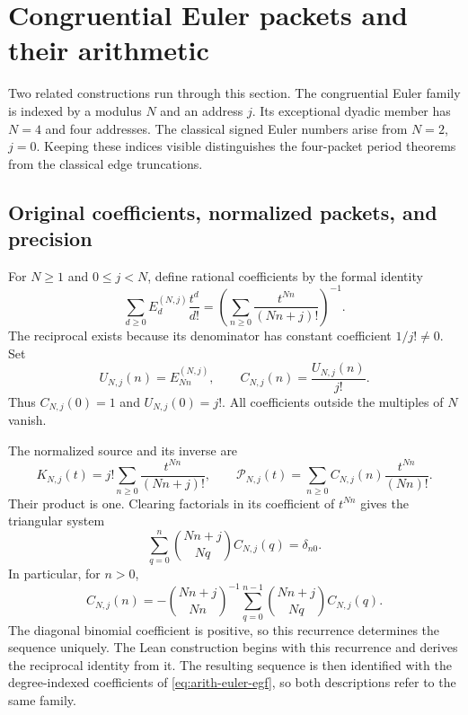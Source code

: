 \section{Congruential Euler packets and their arithmetic}
\label{sec:arithmetic}

Two related constructions run through this section.  The congruential
Euler family is indexed by a modulus $N$ and an address $j$.  Its
exceptional dyadic member has $N=4$ and four addresses.  The classical
signed Euler numbers arise from $N=2$, $j=0$.  Keeping these indices
visible distinguishes the four-packet period theorems from the classical
edge truncations.

\subsection{Original coefficients, normalized packets, and precision}

\begin{definition}\label{def:arith-euler}
For $N\ge1$ and $0\le j<N$, define rational coefficients by the formal identity
\begin{equation}\label{eq:arith-euler-egf}
 \sum_{d\ge0}E_d^{(N,j)}\frac{t^d}{d!}
 =\left(\sum_{n\ge0}\frac{t^{Nn}}{(Nn+j)!}\right)^{-1}.
\end{equation}
The reciprocal exists because its denominator has constant coefficient
$1/j!\ne0$.  Set
\[
 U_{N,j}(n)=E_{Nn}^{(N,j)},\qquad C_{N,j}(n)=\frac{U_{N,j}(n)}{j!}.
\]
Thus $C_{N,j}(0)=1$ and $U_{N,j}(0)=j!$.  All coefficients outside the
multiples of $N$ vanish.
\end{definition}

The normalized source and its inverse are
\begin{equation}\label{eq:arith-kernel}
 K_{N,j}(t)=j!\sum_{n\ge0}\frac{t^{Nn}}{(Nn+j)!},\qquad
 \mathcal P_{N,j}(t)=\sum_{n\ge0}C_{N,j}(n)\frac{t^{Nn}}{(Nn)!}.
\end{equation}
Their product is one.  Clearing factorials in its coefficient of $t^{Nn}$
gives the triangular system
\begin{equation}\label{eq:arith-triangular}
 \sum_{q=0}^{n}\binom{Nn+j}{Nq}C_{N,j}(q)=\delta_{n0}.
\end{equation}
In particular, for $n>0$,
\[
 C_{N,j}(n)=-\binom{Nn+j}{Nn}^{-1}
       \sum_{q=0}^{n-1}\binom{Nn+j}{Nq}C_{N,j}(q).
\]
The diagonal binomial coefficient is positive, so this recurrence determines
the sequence uniquely.  The Lean construction begins with this recurrence
and derives the reciprocal identity from it.  The resulting sequence is
then identified with the degree-indexed coefficients of
\eqref{eq:arith-euler-egf}, so both descriptions refer to the same family.

